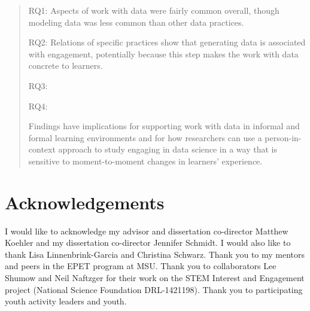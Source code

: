 \documentclass[]{msu-thesis}
\theoremstyle{definition}
\theoremstyle{definition}
\theoremstyle{definition}
\theoremstyle{remark}
\begin{document}
\begin{abstract}
RQ1: Aspects of work with data were fairly common overall, though modeling data was less common than other data practices.

RQ2: Relations of specific practices show that generating data is associated with engagement, potentially because this step makes the work with data concrete to learners.

RQ3:

RQ4:

Findings have implications for supporting work with data in informal and formal learning environments and for how researchers can use a person-in-context approach to study engaging in data science in a way that is sensitive to moment-to-moment changes in learners' experience.

\end{abstract}

\clearpage

\makecopyrightpage

%
\makededicationpage
%
\clearpage

\chapter*{Acknowledgements}
\DoubleSpacing %
I would like to acknowledge my advisor and dissertation co-director Matthew Koehler and my dissertation co-director Jennifer Schmidt. I would also like to thank Lisa Linnenbrink-Garcia and Christina Schwarz. Thank you to my mentors and peers in the EPET program at MSU. Thank you to collaborators Lee Shumow and Neil Naftzger for their work on the STEM Interest and Engagement project (National Science Foundation DRL-1421198). Thank you to participating youth activity leaders and youth.
\clearpage

\SingleSpacing
\tableofcontents* %
\clearpage
\listoftables %
\clearpage
\listoffigures %
\mainmatter
%
\end{document}
